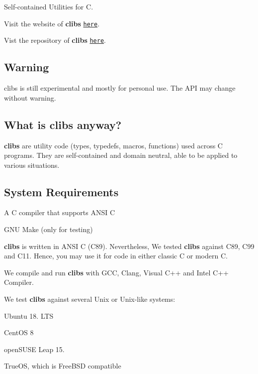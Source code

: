 \href{https://opensource.org/licenses/MIT}{\tt } \href{https://ci.appveyor.com/project/cwchentw/clibs}{\tt }

Self-\/contained Utilities for C.

Visit the website of {\bfseries clibs} \href{https://cwchentw.github.io/clibs/html/index.html}{\tt here}.

Vist the repository of {\bfseries clibs} \href{https://github.com/cwchentw/clibs/}{\tt here}.

\subsection*{Warning}

clibs is still experimental and mostly for personal use. The A\+PI may change without warning.

\subsection*{What is clibs anyway?}

{\bfseries clibs} are utility code (types, typedefs, macros, functions) used across C programs. They are self-\/contained and domain neutral, able to be applied to various situations.

\subsection*{System Requirements}


\begin{DoxyItemize}
\item A C compiler that supports A\+N\+SI C
\item G\+NU Make (only for testing)
\end{DoxyItemize}

{\bfseries clibs} is written in A\+N\+SI C (C89). Nevertheless, We tested {\bfseries clibs} against C89, C99 and C11. Hence, you may use it for code in either classic C or modern C.

We compile and run {\bfseries clibs} with G\+CC, Clang, Visual C++ and Intel C++ Compiler.

We test {\bfseries clibs} against several Unix or Unix-\/like systems\+:


\begin{DoxyItemize}
\item Ubuntu 18. L\+TS
\item Cent\+OS 8
\item open\+S\+U\+SE Leap 15.
\item True\+OS, which is Free\+B\+SD compatible
\end{DoxyItemize}

